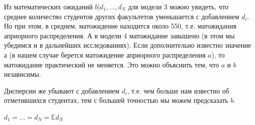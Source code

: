 \documentclass[12pt, a4paper]{article}
\begin{document}
			Из математических ожиданий $b|d_1, ..., d_N$ для модели 3 можно увидеть, что среднее количество студентов других факультетов уменьшается с добавлением $d_i$. Но при этом, в среднем, матожидение находится около 550, т.е. матожидания априорного распределения. А в модели 4 матожидание завышено (в этом мы убедимся и в дальнейших исследованиях). Если дополнительно известно значение а (в нашем случае берется матожидение априорного распределения $a$), то матожидание практический не меняется. Это можно объяснить тем, что $a$ и $b$ независимы.
			
			Дисперсии же убывают с добавлением $d_i$, т.е. чем больше нам известно об отметившихся студентах, тем с большей точностью мы можем предсказать $b$.
			
			\newpage
			\begin{center}
			$d_1 = ... = d_N = \mathbb{E} d_N$
			

\end{center}
\end{document}
